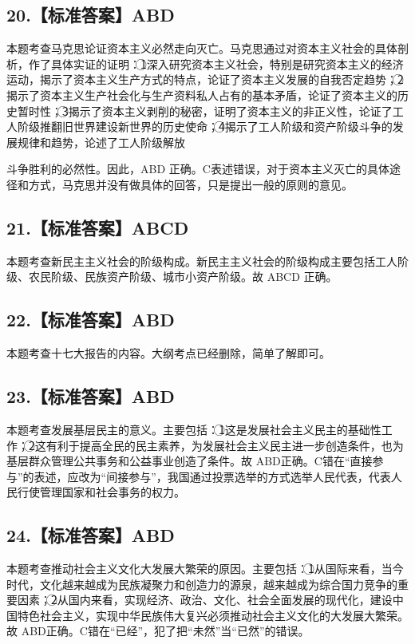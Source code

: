 \documentclass[UTF8,11pt]{ctexart}
\begin{document}
\subsection*{20.【标准答案】ABD}

本题考查马克思论证资本主义必然走向灭亡。马克思通过对资本主义社会的具体剖析，作了具体实证的证明：\textcircled{1}深入研究资本主义社会，特别是研究资本主义的经济运动，揭示了资本主义生产方式的特点，论证了资本主义发展的自我否定趋势；\textcircled{2}揭示了资本主义生产社会化与生产资料私人占有的基本矛盾，论证了资本主义的历史暂时性；\textcircled{3}揭示了资本主义剥削的秘密，证明了资本主义的非正义性，论证了工人阶级推翻旧世界建设新世界的历史使命；\textcircled{4}揭示了工人阶级和资产阶级斗争的发展规律和趋势，论述了工人阶级解放


斗争胜利的必然性。因此，ABD 正确。C表述错误，对于资本主义灭亡的具体途径和方式，马克思并没有做具体的回答，只是提出一般的原则的意见。


\subsection*{21.【标准答案】ABCD}

本题考查新民主主义社会的阶级构成。新民主主义社会的阶级构成主要包括工人阶级、农民阶级、民族资产阶级、城市小资产阶级。故 ABCD 正确。


\subsection*{22.【标准答案】ABD}

本题考查十七大报告的内容。大纲考点已经删除，简单了解即可。


\subsection*{23.【标准答案】ABD}

本题考查发展基层民主的意义。主要包括：\textcircled{1}这是发展社会主义民主的基础性工作；\textcircled{2}这有利于提高全民的民主素养，为发展社会主义民主进一步创造条件，也为基层群众管理公共事务和公益事业创造了条件。故 ABD正确。C错在“直接参与”的表述，应改为“间接参与”，我国通过投票选举的方式选举人民代表，代表人民行使管理国家和社会事务的权力。


\subsection*{24.【标准答案】ABD}

本题考查推动社会主义文化大发展大繁荣的原因。主要包括：\textcircled{1}从国际来看，当今时代，文化越来越成为民族凝聚力和创造力的源泉，越来越成为综合国力竞争的重要因素；\textcircled{2}从国内来看，实现经济、政治、文化、社会全面发展的现代化，建设中国特色社会主义，实现中华民族伟大复兴必须推动社会主义文化的大发展大繁荣。故 ABD正确。C错在“已经”，犯了把“未然”当“已然”的错误。
\end{document}
